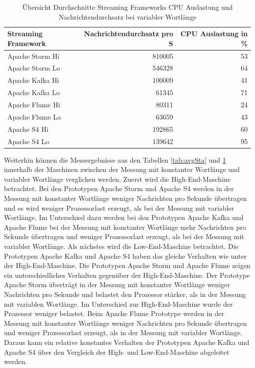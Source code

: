 \begin{table}[!ht]
	\centering
		\begin{tabular}{@{}lrr@{}} \toprule
			\textbf{Streaming Framework} & \textbf{Nachrichtendurchsatz pro S} & \textbf{CPU Auslastung in \%} \\ \midrule
			Apache Storm Hi & 810005 & 53 \\
			Apache Storm Lo & 546328 & 64 \\			
			Apache Kafka Hi & 100009 & 41 \\
			Apache Kafka Lo & 61345 & 71 \\
			Apache Flume Hi & 80311 & 24 \\
			Apache Flume Lo & 63659 & 43 \\
			Apache S4 Hi & 192865 & 60 \\
			Apache S4 Lo & 139642 & 95 \\
			\bottomrule			
		\end{tabular}
	\caption{Übersicht Durchschnitte Streaming Frameworks CPU Auslastung und Nachrichtendurchsatz bei variabler Wortlänge}
	\label{tab:avgDyn}
\end{table}

Weiterhin können die Messergebnisse aus den Tabellen \ref{tab:avgSta} und \ref{tab:avgDyn} innerhalb der Maschinen zwischen der Messung mit konstanter Wortlänge und variabler Wortlänge verglichen werden. Zuerst wird die High-End-Maschine betrachtet. Bei den Prototypen Apache Storm und Apache S4 werden in der Messung mit konstanter Wortlänge weniger Nachrichten pro Sekunde übertragen und es wird weniger Prozessorlast erzeugt, als bei der Messung mit variabler Wortlänge. Im Unterschied dazu werden bei den Prototypen Apache Kafka und Apache Flume bei der Messung mit konstanter Wortlänge mehr Nachrichten pro Sekunde übertragen und weniger Prozessorlast erzeugt, als bei der Messung mit variabler Wortlänge. Als nächstes wird die Low-End-Maschine betrachtet. Die Prototypen Apache Kafka und Apache S4 haben das gleiche Verhalten wie unter der High-End-Maschine. Die Prototypen Apache Storm und Apache Flume zeigen ein unterschiedliches Verhalten gegenüber der High-End-Maschine. Der Prototype Apache Storm überträgt in der Messung mit konstanter Wortlänge weniger Nachrichten pro Sekunde und belastet den Prozessor stärker, als in der Messung mit variablen Wortlänge. Im Unterschied zur High-End-Maschine wurde der Prozessor weniger belastet. Beim Apache Flume Prototype werden in der Messung mit konstanter Wortlänge weniger Nachrichten pro Sekunde übertragen und weniger Prozessorlast erzeugt, als in der Messung mit variabler Wortlänge. Daraus kann ein relative konstantes Verhalten der Prototypen Apache Kafka und Apache S4 über den Vergleich der High- und Low-End-Maschine abgeleitet werden.


